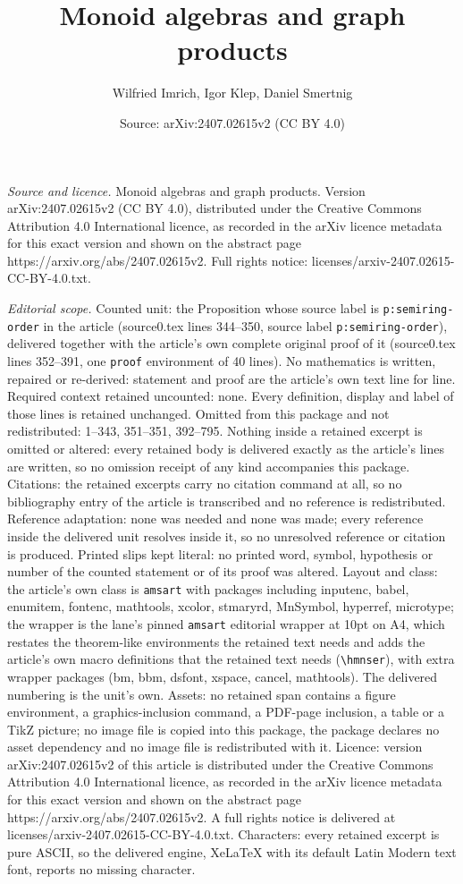 \documentclass[10pt,a4paper]{amsart}
\title[Monoid algebras and graph products]{Monoid algebras and graph products}
\author{Wilfried Imrich, Igor Klep, Daniel Smertnig}
\date{Source: arXiv:2407.02615v2 (CC BY 4.0)}
\begin{document}
\maketitle

\noindent\emph{Source and licence.} Monoid algebras and graph products. Version arXiv:2407.02615v2 (CC BY 4.0), distributed under the Creative Commons Attribution 4.0 International licence, as recorded in the arXiv licence metadata for this exact version and shown on the abstract page https://arxiv.org/abs/2407.02615v2. Full rights notice: licenses/arxiv-2407.02615-CC-BY-4.0.txt.\par\smallskip

\noindent\textit{Editorial scope.} Counted unit: the Proposition whose source label is \texttt{p:semiring-order} in the article (source0.tex lines 344--350, source label \texttt{p:semiring-order}), delivered together with the article's own complete original proof of it (source0.tex lines 352--391, one \texttt{proof} environment of 40 lines). No mathematics is written, repaired or re-derived: statement and proof are the article's own text line for line. Required context retained uncounted: none. Every definition, display and label of those lines is retained unchanged. Omitted from this package and not redistributed: 1--343, 351--351, 392--795. Nothing inside a retained excerpt is omitted or altered: every retained body is delivered exactly as the article's lines are written, so no omission receipt of any kind accompanies this package. Citations: the retained excerpts carry no citation command at all, so no bibliography entry of the article is transcribed and no reference is redistributed. Reference adaptation: none was needed and none was made; every reference inside the delivered unit resolves inside it, so no unresolved reference or citation is produced. Printed slips kept literal: no printed word, symbol, hypothesis or number of the counted statement or of its proof was altered. Layout and class: the article's own class is \texttt{amsart} with packages including inputenc, babel, enumitem, fontenc, mathtools, xcolor, stmaryrd, MnSymbol, hyperref, microtype; the wrapper is the lane's pinned \texttt{amsart} editorial wrapper at 10pt on A4, which restates the theorem-like environments the retained text needs and adds the article's own macro definitions that the retained text needs (\texttt{\textbackslash hmnser}), with extra wrapper packages (bm, bbm, dsfont, xspace, cancel, mathtools). The delivered numbering is the unit's own. Assets: no retained span contains a figure environment, a graphics-inclusion command, a PDF-page inclusion, a table or a TikZ picture; no image file is copied into this package, the package declares no asset dependency and no image file is redistributed with it. Licence: version arXiv:2407.02615v2 of this article is distributed under the Creative Commons Attribution 4.0 International licence, as recorded in the arXiv licence metadata for this exact version and shown on the abstract page https://arxiv.org/abs/2407.02615v2. A full rights notice is delivered at licenses/arxiv-2407.02615-CC-BY-4.0.txt. Characters: every retained excerpt is pure ASCII, so the delivered engine, XeLaTeX with its default Latin Modern text font, reports no missing character.
\end{document}
